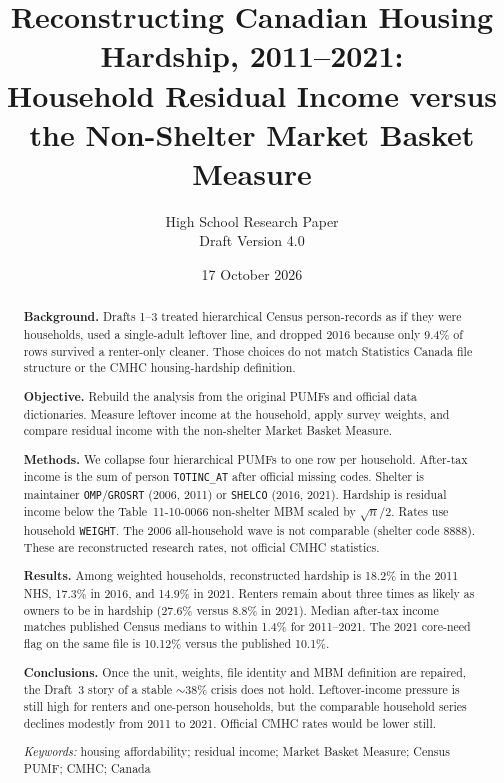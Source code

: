 \documentclass[11pt,letterpaper]{article}
\title{\textbf{Reconstructing Canadian Housing Hardship, 2011--2021:\\
Household Residual Income versus the Non-Shelter Market Basket Measure}}
\author{High School Research Paper\\[0.4em]
\large Draft Version 4.0}
\date{17 October 2026}
\begin{document}
\maketitle

\begin{abstract}
\noindent\textbf{Background.}
Drafts 1--3 treated hierarchical Census person-records as if they were households, used a single-adult leftover line, and dropped 2016 because only 9.4\% of rows survived a renter-only cleaner. Those choices do not match Statistics Canada file structure or the CMHC housing-hardship definition.

\noindent\textbf{Objective.}
Rebuild the analysis from the original PUMFs and official data dictionaries. Measure leftover income at the household, apply survey weights, and compare residual income with the non-shelter Market Basket Measure.

\noindent\textbf{Methods.}
We collapse four hierarchical PUMFs to one row per household. After-tax income is the sum of person \texttt{TOTINC\_AT} after official missing codes. Shelter is maintainer \texttt{OMP}/\texttt{GROSRT} (2006, 2011) or \texttt{SHELCO} (2016, 2021). Hardship is residual income below the Table~11-10-0066 non-shelter MBM scaled by $\sqrt{n}/2$. Rates use household \texttt{WEIGHT}. The 2006 all-household wave is not comparable (shelter code 8888). These are reconstructed research rates, not official CMHC statistics.

\noindent\textbf{Results.}
Among weighted households, reconstructed hardship is 18.2\% in the 2011 NHS, 17.3\% in 2016, and 14.9\% in 2021. Renters remain about three times as likely as owners to be in hardship (27.6\% versus 8.8\% in 2021). Median after-tax income matches published Census medians to within 1.4\% for 2011--2021. The 2021 core-need flag on the same file is 10.12\% versus the published 10.1\%.

\noindent\textbf{Conclusions.}
Once the unit, weights, file identity and MBM definition are repaired, the Draft~3 story of a stable $\sim$38\% crisis does not hold. Leftover-income pressure is still high for renters and one-person households, but the comparable household series declines modestly from 2011 to 2021. Official CMHC rates would be lower still.

\medskip
\noindent\textit{Keywords:} housing affordability; residual income; Market Basket Measure; Census PUMF; CMHC; Canada
\end{abstract}

\tableofcontents
\newpage
\end{document}
